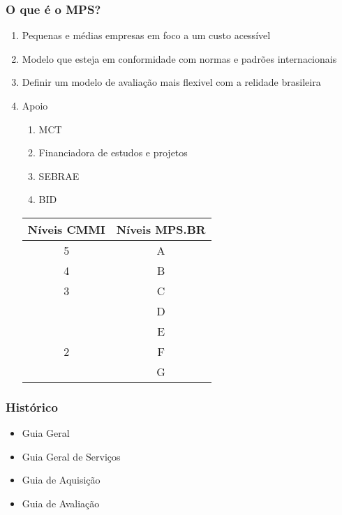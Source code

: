 \documentclass{article}
\begin{document}
	
\subsubsection{O que é o MPS?} 
	
	\begin{enumerate}		
	
	\item Pequenas e médias empresas em foco a um custo acessível
	\item Modelo que esteja em conformidade com normas e padrões internacionais
	\item Definir um modelo de avaliação mais flexivel com a relidade brasileira
	
	\item Apoio 
		\begin{enumerate}
		\item MCT
		\item Financiadora de estudos e projetos
		\item SEBRAE
		\item BID		
		\end{enumerate}

\begin{center}
	\begin{tabular}{|c|c|}
	\hline 
	Níveis CMMI & Níveis MPS.BR \\
	\hline
	5 &  A\\
	\hline
	4 & B\\
	\hline
	3 & C\\
	& D\\
	& E\\
	\hline
	2 & F\\
	& G	\\
	\hline
	\end{tabular}
\end{center}
		
	\end{enumerate}
			
\subsubsection{Histórico}
	\begin{itemize}
	\item Guia Geral
	\item Guia Geral de Serviços
	\item Guia de Aquisição
	\item Guia de Avaliação
	\end{itemize}		
	
\end{document}
